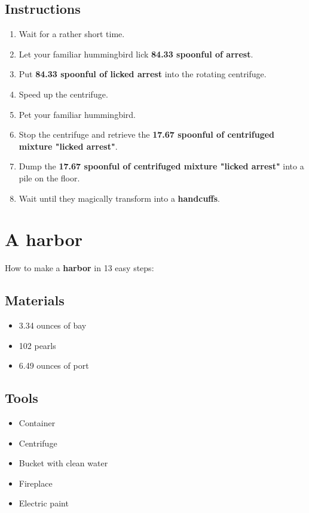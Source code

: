 \documentclass{article}
\begin{document}
\subsection{Instructions}\begin{enumerate}
\item 
Wait for a rather short time.
\item 
Let your familiar hummingbird lick \textbf{84.33 spoonful of arrest}.
\item 
Put \textbf{84.33 spoonful of licked arrest} into the rotating centrifuge.
\item 
Speed up the centrifuge.
\item 
Pet your familiar hummingbird.
\item 
Stop the centrifuge and retrieve the \textbf{17.67 spoonful of centrifuged mixture "licked arrest"}.
\item 
Dump the \textbf{17.67 spoonful of centrifuged mixture "licked arrest"} into a pile on the floor.
\item 
Wait until they magically transform into a \textbf{handcuffs}.
\end{enumerate}
\newpage
\section{A harbor}How to make a \textbf{harbor} in 13 easy steps:

\subsection{Materials}\begin{itemize}
\item 
3.34 ounces of bay
\item 
102 pearls
\item 
6.49 ounces of port
\end{itemize}
\subsection{Tools}\begin{itemize}
\item 
Container
\item 
Centrifuge
\item 
Bucket with clean water
\item 
Fireplace
\item 
Electric paint
\end{itemize}
\end{document}
